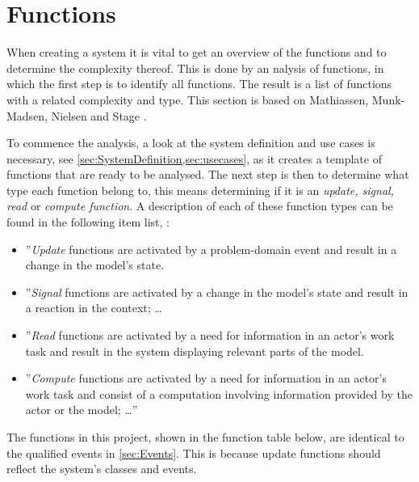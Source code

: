 \section{Functions} \label{sec:functions}
When creating a system it is vital to get an overview of the functions and to determine the complexity thereof.
This is done by an nalysis of functions, in which the first step is to identify all functions.
The result is a list of functions with a related complexity and type.
This section is based on Mathiassen, Munk-Madsen, Nielsen and Stage \citep[ch.~7]{Rod-Aalborg}.

To commence the analysis, a look at the system definition and use cases is necessary, see \cref{sec:SystemDefinition,sec:usecases}, as it creates a template of functions that are ready to be analysed.
The next step is then to determine what type each function belong to, this means determining if it is an \textit{update, signal, read} or \textit{compute function}.
A description of each of these function types can be found in the following item list, \citep[p.~140]{Rod-Aalborg}:

\begin{itemize}
	\item 
	''\textit{Update} functions are  activated by a problem-domain event and result in a change in the model's state.
	\item 
	''\textit{Signal} functions are activated by a change in the model's state and result in a reaction in the context; \ldots
	\item
	''\textit{Read} functions are activated by a need for information in an actor's work task and result in the system displaying relevant parts of the model.
	\item
	''\textit{Compute} functions are activated by a need for information in an actor's work task and consist of a computation involving information provided by the actor or the model; \ldots''
\end{itemize}

The functions in this project, shown in the function table below, are identical to the qualified events in \cref{sec:Events}.
This is because update functions should reflect the system's classes and events.

